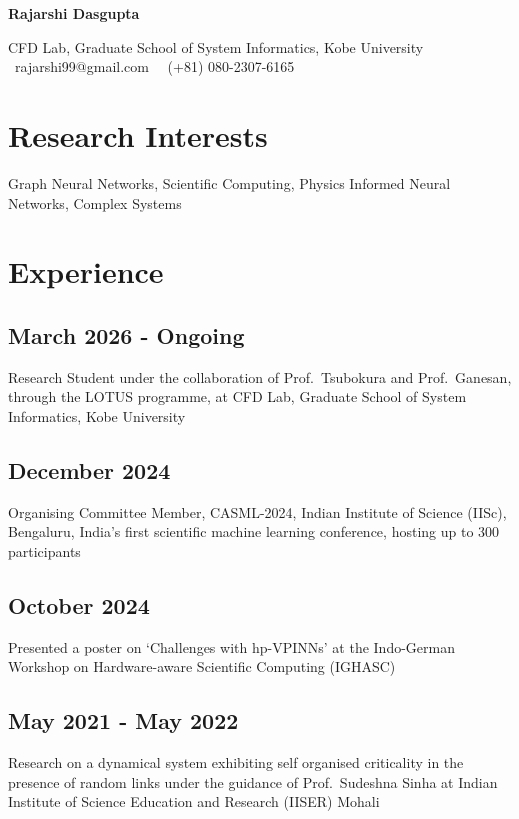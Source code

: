 \documentclass{article}
\newcommand{\theauthor}{Rajarshi Dasgupta}
\begin{document}
\begin{center}
	{\bf \huge \theauthor}

	\vspace{1em}

	CFD Lab, Graduate School of System Informatics, Kobe University\\
	\faEnvelopeO \, rajarshi99@gmail.com \,
	\faPhone \, (+81) 080-2307-6165
\end{center}

\section{Research Interests}

Graph Neural Networks,
Scientific Computing,
Physics Informed Neural Networks,
Complex Systems

\section{Experience}

\subsection{March 2026 - Ongoing}
Research Student 
under the collaboration of Prof.~Tsubokura and Prof.~Ganesan,
through the LOTUS programme,
at CFD Lab, Graduate School of System Informatics, Kobe University 

\subsection{December 2024}
Organising Committee Member, CASML-2024, Indian Institute of Science (IISc), Bengaluru,
India's first scientific machine learning conference, hosting up to 300 participants

\subsection{October 2024}
Presented a poster on `Challenges with hp-VPINNs'
at the Indo-German Workshop on Hardware-aware Scientific Computing (IGHASC)

\subsection{May 2021 - May 2022}
Research on a dynamical system
exhibiting self organised criticality
in the presence of random links
under the guidance of Prof.~Sudeshna Sinha
at Indian Institute of Science Education and Research (IISER)
Mohali
\end{document}
